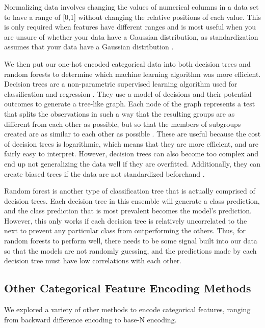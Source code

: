 \documentclass[12pt,letterpaper]{article}
\theoremstyle{plain}
\theoremstyle{definition}
\begin{document}
Normalizing data involves changing the values of numerical columns in a data set to have a range of [0,1] without changing the relative positions of each value. This is only required when features have different ranges and is most useful when you are unsure of whether your data have a Gaussian distribution, as standardization assumes that your data have a Gaussian distribution \cite{rescale}. 

We then put our one-hot encoded categorical data into both decision trees and random forests to determine which machine learning algorithm was more efficient. Decision trees are a non-parametric supervised learning algorithm used for classification and regression \cite{trees}. They use a model of decisions and their potential outcomes to generate a tree-like graph. Each node of the graph represents a test that splits the observations in such a way that the resulting groups are as different from each other as possible, but so that the members of subgroups created are as similar to each other as possible \cite{randomforest}. These are useful because the cost of decision trees is logarithmic, which means that they are more efficient, and are fairly easy to interpret. However, decision trees can also become too complex and end up not generalizing the data well if they are overfitted. Additionally, they can create biased trees if the data are not standardized beforehand \cite{trees}. 

Random forest is another type of classification tree that is actually comprised of decision trees. Each decision tree in this ensemble will generate a class prediction, and the class prediction that is most prevalent becomes the model's prediction. However, this only works if each decision tree is relatively uncorrelated to the next to prevent any particular class from outperforming the others. Thus, for random forests to perform well, there needs to be some signal built into our data so that the models are not randomly guessing, and the predictions made by each decision tree must have low correlations with each other. \cite{randomforest} 

\subsection{Other Categorical Feature Encoding Methods}
\hspace{\parindent} We explored a variety of other methods to encode categorical features, ranging from backward difference encoding to base-N encoding. 
\end{document}

